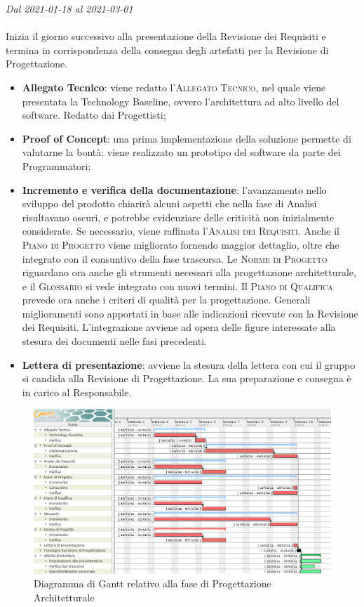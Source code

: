\textit{Dal 2021-01-18 al 2021-03-01}
\\\\
Inizia il giorno successivo alla presentazione della Revisione dei Requisiti e termina in corrispondenza della consegna degli artefatti per la Revisione di Progettazione.
\begin{itemize}
	\item \textbf{Allegato Tecnico}: viene redatto l'\textsc{Allegato Tecnico}, nel quale viene presentata la Technology Baseline, ovvero l'architettura ad alto livello del software. Redatto dai Progettisti;
	\item \textbf{Proof of Concept}: una prima implementazione della soluzione permette di valutarne la bontà: viene realizzato un prototipo del software da parte dei Programmatori;
	\item \textbf{Incremento e verifica della documentazione}: l'avanzamento nello sviluppo del prodotto chiarirà alcuni aspetti che nella fase di Analisi risultavano oscuri, e potrebbe evidenziare delle criticità non inizialmente considerate. Se necessario, viene raffinata l'\textsc{Analisi dei Requisiti}. Anche il \textsc{Piano di Progetto} viene migliorato fornendo maggior dettaglio, oltre che integrato con il consuntivo della fase trascorsa. Le \textsc{Norme di Progetto} riguardano ora anche gli strumenti necessari alla progettazione architetturale, e il \textsc{Glossario} si vede integrato con nuovi termini. Il \textsc{Piano di Qualifica} prevede ora anche i criteri di qualità per la progettazione. Generali miglioramenti sono apportati in base alle indicazioni ricevute con la Revisione dei Requisiti. L'integrazione avviene ad opera delle figure interessate alla stesura dei documenti nelle fasi precedenti.
	\item \textbf{Lettera di presentazione}: avviene la stesura della lettera con cui il gruppo si candida alla Revisione di Progettazione. La sua preparazione e consegna è in carico al Responsabile.
\end{itemize}

\begin{figure}[H]
	\centering
	\includegraphics[scale=0.50]{res/images/03_gantt_progettazione.png}
	\caption{Diagramma di Gantt relativo alla fase di Progettazione Architetturale}
\end{figure}

